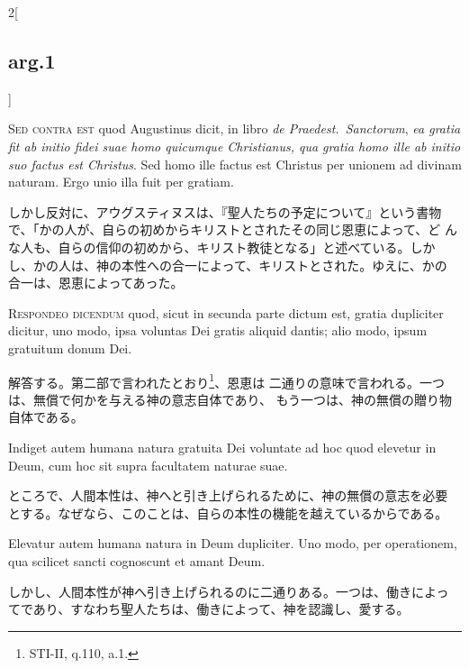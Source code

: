\documentclass[paper=a4paper,fontsize=10pt,jafontsize=9pt,titlepage]{jlreq}
\begin{document}
\begin{paracol}{2}[\subsection{arg.1}]
\switchcolumn*[\subsection{s.c.}]

{\scshape Sed contra est} quod Augustinus dicit, in libro {\itshape de
Praedest.~Sanctorum}, {\itshape ea gratia fit ab initio fidei suae
homo quicumque Christianus, qua gratia homo ille ab initio suo factus
est Christus}. Sed homo ille factus est Christus per unionem ad
divinam naturam. Ergo unio illa fuit per gratiam.

\switchcolumn

しかし反対に、アウグスティヌスは、『聖人たちの予定について』という書物
で、「かの人が、自らの初めからキリストとされたその同じ恩恵によって、ど
んな人も、自らの信仰の初めから、キリスト教徒となる」と述べている。しか
し、かの人は、神の本性への合一によって、キリストとされた。ゆえに、かの
合一は、恩恵によってあった。


{\scshape Respondeo dicendum} quod, sicut in secunda parte dictum est,
gratia dupliciter dicitur, uno modo, ipsa voluntas Dei gratis aliquid
dantis; alio modo, ipsum gratuitum donum Dei.

\switchcolumn

解答する。第二部で言われたとおり\footnote{STI-II, q.110, a.1.}、恩恵は
二通りの意味で言われる。一つは、無償で何かを与える神の意志自体であり、
もう一つは、神の無償の贈り物自体である。

\switchcolumn*

Indiget autem humana natura gratuita Dei voluntate ad hoc quod
elevetur in Deum, cum hoc sit supra facultatem naturae suae.

\switchcolumn

ところで、人間本性は、神へと引き上げられるために、神の無償の意志を必要
とする。なぜなら、このことは、自らの本性の機能を越えているからである。

\switchcolumn*

Elevatur autem humana natura in Deum dupliciter. Uno modo, per
operationem, qua scilicet sancti cognoscunt et amant Deum.

\switchcolumn

しかし、人間本性が神へ引き上げられるのに二通りある。一つは、働きによっ
てであり、すなわち聖人たちは、働きによって、神を認識し、愛する。


\end{paracol}
\end{document}
